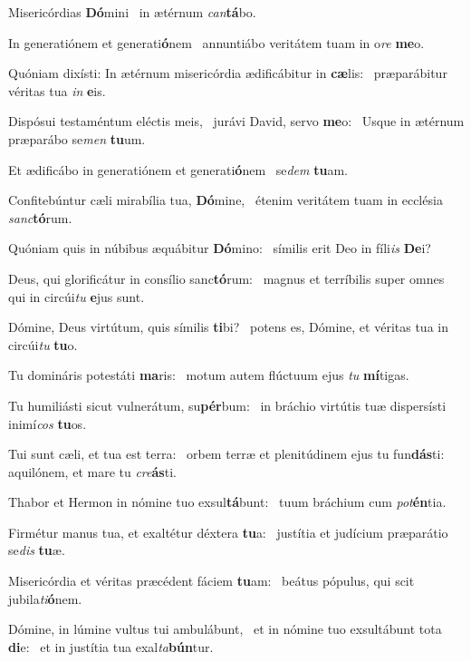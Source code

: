 \item Misericórdias \textbf{Dó}mini~\psstar{} in ætérnum \textit{can}\textbf{tá}bo.
\item In generatiónem et generati\textbf{ó}nem~\psstar{} annuntiábo veritátem tuam in o\textit{re} \textbf{me}o.
\item Quóniam dixísti: In ætérnum misericórdia ædificábitur in \textbf{cæ}lis:~\psstar{} præparábitur véritas tua \textit{in} \textbf{e}is.
\item Dispósui testaméntum eléctis meis,~\pscross{} jurávi David, servo \textbf{me}o:~\psstar{} Usque in ætérnum præparábo se\textit{men} \textbf{tu}um.
\item Et ædificábo in generatiónem et generati\textbf{ó}nem~\psstar{} se\textit{dem} \textbf{tu}am.
\item Confitebúntur cæli mirabília tua, \textbf{Dó}mine,~\psstar{} étenim veritátem tuam in ecclésia \textit{sanc}\textbf{tó}rum.
\item Quóniam quis in núbibus æquábitur \textbf{Dó}mino:~\psstar{} símilis erit Deo in fíli\textit{is} \textbf{De}i?
\item Deus, qui glorificátur in consílio sanc\textbf{tó}rum:~\psstar{} magnus et terríbilis super omnes qui in circúi\textit{tu} \textbf{e}jus sunt.
\item Dómine, Deus virtútum, quis símilis \textbf{ti}bi?~\psstar{} potens es, Dómine, et véritas tua in circúi\textit{tu} \textbf{tu}o.
\item Tu domináris potestáti \textbf{ma}ris:~\psstar{} motum autem flúctuum ejus \textit{tu} \textbf{mí}tigas.
\item Tu humiliásti sicut vulnerátum, su\textbf{pér}bum:~\psstar{} in bráchio virtútis tuæ dispersísti inimí\textit{cos} \textbf{tu}os.
\item Tui sunt cæli, et tua est terra:~\pscross{} orbem terræ et plenitúdinem ejus tu fun\textbf{dás}ti:~\psstar{} aquilónem, et mare tu \textit{cre}\textbf{ás}ti.
\item Thabor et Hermon in nómine tuo exsul\textbf{tá}bunt:~\psstar{} tuum bráchium cum \textit{pot}\textbf{én}tia.
\item Firmétur manus tua, et exaltétur déxtera \textbf{tu}a:~\psstar{} justítia et judícium præparátio se\textit{dis} \textbf{tu}æ.
\item Misericórdia et véritas præcédent fáciem \textbf{tu}am:~\psstar{} beátus pópulus, qui scit jubila\textit{ti}\textbf{ó}nem.
\item Dómine, in lúmine vultus tui ambulábunt,~\pscross{} et in nómine tuo exsultábunt tota \textbf{di}e:~\psstar{} et in justítia tua exal\textit{ta}\textbf{bún}tur.
